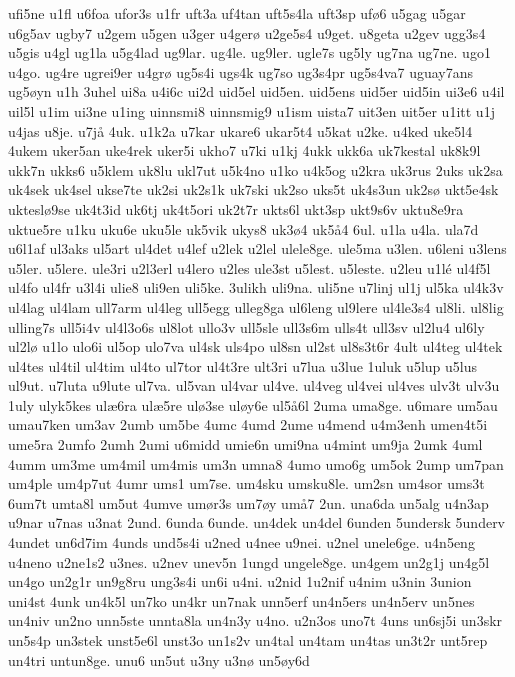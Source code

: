 {ufi5ne
u1fl
u6foa
ufor3s
u1fr
uft3a
uf4tan
uft5s4la
uft3sp
uf^^f86
u5gag
u5gar
u6g5av
ugby7
u2gem
u5gen
u3ger
u4ger^^f8
u2ge5s4
u9get.
u8geta
u2gev
ugg3s4
u5gis
u4gl
ug1la
u5g4lad
ug9lar.
ug4le.
ug9ler.
ugle7s
ug5ly
ug7na
ug7ne.
ugo1
u4go.
ug4re
ugrei9er
u4gr^^f8
ug5s4i
ugs4k
ug7so
ug3s4pr
ug5s4va7
uguay7ans
ug5^^f8yn
u1h
3uhel
ui8a
u4i6c
ui2d
uid5el
uid5en.
uid5ens
uid5er
uid5in
ui3e6
u4il
uil5l
u1im
ui3ne
u1ing
uinnsmi8
uinnsmig9
u1ism
uista7
uit3en
uit5er
u1itt
u1j
u4jas
u8je.
u7j^^e5
4uk.
u1k2a
u7kar
ukare6
ukar5t4
u5kat
u2ke.
u4ked
uke5l4
4ukem
uker5an
uke4rek
uker5i
ukho7
u7ki
u1kj
4ukk
ukk6a
uk7kestal
uk8k9l
ukk7n
ukks6
u5klem
uk8lu
ukl7ut
u5k4no
u1ko
u4k5og
u2kra
uk3rus
2uks
uk2sa
uk4sek
uk4sel
ukse7te
uk2si
uk2s1k
uk7ski
uk2so
uks5t
uk4s3un
uk2s^^f8
ukt5e4sk
uktesl^^f89se
uk4t3id
uk6tj
uk4t5ori
uk2t7r
ukts6l
ukt3sp
ukt9s6v
uktu8e9ra
uktue5re
u1ku
uku6e
uku5le
uk5vik
ukys8
uk3^^f84
uk5^^e54
6ul.
u1la
u4la.
ula7d
u6l1af
ul3aks
ul5art
ul4det
u4lef
u2lek
u2lel
ulele8ge.
ule5ma
u3len.
u6leni
u3lens
u5ler.
u5lere.
ule3ri
u2l3erl
u4lero
u2les
ule3st
u5lest.
u5leste.
u2leu
u1l^^e9
ul4f5l
ul4fo
ul4fr
u3l4i
ulie8
uli9en
uli5ke.
3ulikh
uli9na.
uli5ne
u7linj
ul1j
ul5ka
ul4k3v
ul4lag
ul4lam
ull7arm
ul4leg
ull5egg
ulleg8ga
ul6leng
ul9lere
ul4le3s4
ul8li.
ul8lig
ulling7s
ull5i4v
ul4l3o6s
ul8lot
ullo3v
ull5sle
ull3s6m
ulls4t
ull3sv
ul2lu4
ul6ly
ul2l^^f8
u1lo
ulo6i
ul5op
ulo7va
ul4sk
uls4po
ul8sn
ul2st
ul8s3t6r
4ult
ul4teg
ul4tek
ul4tes
ul4til
ul4tim
ul4to
ul7tor
ul4t3re
ult3ri
u7lua
u3lue
1uluk
u5lup
u5lus
ul9ut.
u7luta
u9lute
ul7va.
ul5van
ul4var
ul4ve.
ul4veg
ul4vei
ul4ves
ulv3t
ulv3u
1uly
ulyk5kes
ul^^e66ra
ul^^e65re
ul^^f83se
ul^^f8y6e
ul5^^e56l
2uma
uma8ge.
u6mare
um5au
umau7ken
um3av
2umb
um5be
4umc
4umd
2ume
u4mend
u4m3enh
umen4t5i
ume5ra
2umfo
2umh
2umi
u6midd
umie6n
umi9na
u4mint
um9ja
2umk
4uml
4umm
um3me
um4mil
um4mis
um3n
umna8
4umo
umo6g
um5ok
2ump
um7pan
um4ple
um4p7ut
4umr
ums1
um7se.
um4sku
umsku8le.
um2sn
um4sor
ums3t
6um7t
umta8l
um5ut
4umve
um^^f8r3s
um7^^f8y
um^^e57
2un.
una6da
un5alg
u4n3ap
u9nar
u7nas
u3nat
2und.
6unda
6unde.
un4dek
un4del
6unden
5undersk
5underv
4undet
un6d7im
4unds
und5s4i
u2ned
u4nee
u9nei.
u2nel
unele6ge.
u4n5eng
u4neno
u2ne1s2
u3nes.
u2nev
unev5n
1ungd
ungele8ge.
un4gem
un2g1j
un4g5l
un4go
un2g1r
un9g8ru
ung3s4i
un6i
u4ni.
u2nid
1u2nif
u4nim
u3nin
3union
uni4st
4unk
un4k5l
un7ko
un4kr
un7nak
unn5erf
un4n5ers
un4n5erv
un5nes
un4niv
un2no
unn5ste
unnta8la
un4n3y
u4no.
u2n3os
uno7t
4uns
un6sj5i
un3skr
un5s4p
un3stek
unst5e6l
unst3o
un1s2v
un4tal
un4tam
un4tas
un3t2r
unt5rep
un4tri
untun8ge.
unu6
un5ut
u3ny
u3n^^f8
un5^^f8y6d
}

